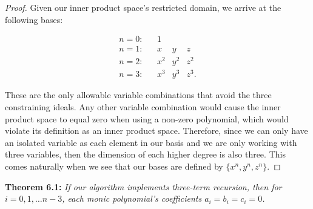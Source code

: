 \documentclass[letterpaper, 12pt]{article}
\begin{document}
\vspace*{-12mm}
	\begin{proof}
	Given our inner product space's restricted domain, we arrive at the following bases:
	
	\vspace*{-5mm}
	$$\begin{array}{lllll}
		n=0: && 1 \\
		n=1: && x & y & z \\
		n=2: && x^2 & y^2 & z^2 \\
		n=3: && x^3 & y^3 & z^3.
	\end{array}$$
	
	\noindent These are the only allowable variable combinations that avoid the three constraining ideals. Any other variable combination would cause the inner product space to equal zero when using a non-zero polynomial, which would violate its definition as an inner product space. Therefore, since we can only have an isolated variable as each element in our basis and we are only working with three variables, then the dimension of each higher degree is also three. This comes naturally when we see that our bases are defined by $\{x^n, y^n, z^n\}$.
	\end{proof}
		
\vspace*{2mm}
\noindent \textbf{Theorem 6.1:} \textit{If our algorithm implements three-term recursion, then for $i = 0, 1, \ldots n-3$, each monic polynomial's coefficients $a_i=b_i=c_i=0$.}
\end{document}
